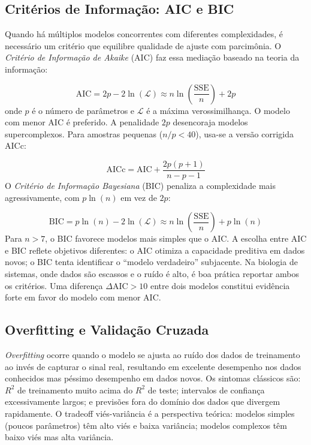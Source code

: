 \subsection{Critérios de Informação: AIC e BIC}

Quando há múltiplos modelos concorrentes com diferentes complexidades, é necessário
um critério que equilibre qualidade de ajuste com parcimônia. O \emph{Critério de
Informação de Akaike} (AIC) faz essa mediação baseado na teoria da informação:

\begin{equation}
\text{AIC} = 2p - 2\ln(\mathcal{L}) \approx n\ln\!\left(\frac{\text{SSE}}{n}\right) + 2p
\end{equation}
onde $p$ é o número de parâmetros e $\mathcal{L}$ é a máxima verossimilhança. O modelo
com menor AIC é preferido. A penalidade $2p$ desencoraja modelos supercomplexos. Para
amostras pequenas ($n/p < 40$), usa-se a versão corrigida AICc:

\begin{equation}
\text{AICc} = \text{AIC} + \frac{2p(p+1)}{n-p-1}
\end{equation}
O \emph{Critério de Informação Bayesiana} (BIC) penaliza a complexidade mais
agressivamente, com $p\ln(n)$ em vez de $2p$:

\begin{equation}
\text{BIC} = p\ln(n) - 2\ln(\mathcal{L}) \approx n\ln\!\left(\frac{\text{SSE}}{n}\right) + p\ln(n)
\end{equation}
Para $n > 7$, o BIC favorece modelos mais simples que o AIC. A escolha entre AIC e BIC
reflete objetivos diferentes: o AIC otimiza a capacidade preditiva em dados novos; o BIC
tenta identificar o ``modelo verdadeiro'' subjacente. Na biologia de sistemas, onde dados
são escassos e o ruído é alto, é boa prática reportar ambos os critérios. Uma diferença
$\Delta\text{AIC} > 10$ entre dois modelos constitui evidência forte em favor do modelo
com menor AIC.

\subsection{Overfitting e Validação Cruzada}

\emph{Overfitting} ocorre quando o modelo se ajusta ao ruído dos dados de treinamento ao
invés de capturar o sinal real, resultando em excelente desempenho nos dados conhecidos mas
péssimo desempenho em dados novos. Os sintomas clássicos são: $R^2$ de treinamento muito
acima do $R^2$ de teste; intervalos de confiança excessivamente largos; e previsões fora
do domínio dos dados que divergem rapidamente. O tradeoff viés-variância é a perspectiva
teórica: modelos simples (poucos parâmetros) têm alto viés e baixa variância; modelos
complexos têm baixo viés mas alta variância.

